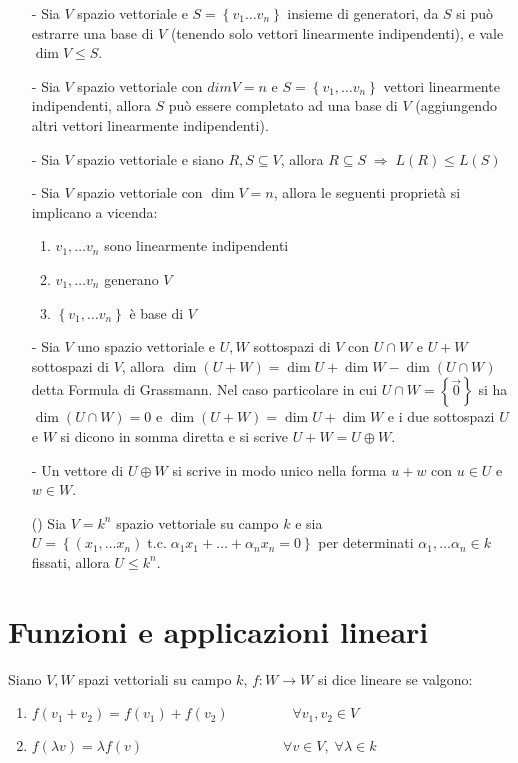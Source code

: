 \documentclass[a4paper]{article}
\newcommand\tc{\;\text{t.c.}\;} %
\begin{document}
\begin{itemize}
	\item[-] Sia \(V\) spazio vettoriale e \(S = \left\{ v_1 \dots v_n \right\}\) insieme di generatori, da \(S\) si può estrarre
	una base di \(V\) (tenendo solo vettori linearmente indipendenti), e vale \(\dim V \leq S\).
	
	\item[-] Sia \(V\) spazio vettoriale con \(dim V = n\) e \(S = \left\{ v_1, \dots v_n \right\}\) vettori linearmente indipendenti,
	allora \(S\) può essere completato ad una base di \(V\) (aggiungendo altri vettori linearmente indipendenti).
	
	\item[-] Sia \(V\) spazio vettoriale e siano \(R,S \subseteq V\), allora \(R \subseteq S \; \Rightarrow \; L(R) \leq L(S)\)
	
	\item[-] Sia \(V\) spazio vettoriale con \(\dim V = n\), allora le seguenti proprietà si implicano a vicenda:
	\begin{enumerate}
		\item \(v_1, \dots v_n\) sono linearmente indipendenti
		\item \(v_1, \dots v_n\) generano \(V\)
		\item \(\left\{ v_1, \dots v_n \right\}\) è base di \(V\)
	\end{enumerate}
	
	\item[-] Sia \(V\) uno spazio vettoriale e \(U, W\) sottospazi di \(V\) con \(U \cap W\) e \(U + W\) sottospazi di \(V\), allora
	\(\dim (U + W) = \dim U + \dim W - \dim (U \cap W)\) detta Formula di Grassmann. Nel caso particolare in cui \(U \cap W = \left\{ \vec{0} \right\}\)
	si ha \(\dim (U \cap W) = 0\) e \(\dim (U + W) = \dim U + \dim W\) e i due sottospazi \(U\) e \(W\) si dicono in somma diretta
	e si scrive \(U + W = U \oplus W\).

	\item[-] Un vettore di \(U \oplus W\) si scrive in modo unico nella forma \(u + w\) con \(u \in U\) e \(w \in W\).
	
	\item[()] Sia \(V = k^n\) spazio vettoriale su campo \(k\) e sia \(U = \left\{ (x_1, \dots x_n) \tc \alpha_1 x_1 + \dots + \alpha_n x_n = 0\right\}\)
	per determinati \(\alpha_1, \dots \alpha_n \in k\) fissati, allora \(U \leq k^n\).
\end{itemize}

\newpage

\section{Funzioni e applicazioni lineari}
Siano \(V, W\) spazi vettoriali su campo \(k\), \(f: W \to W\) si dice lineare se valgono:
\begin{enumerate}
	\item \(f(v_1 + v_2) = f(v_1) + f(v_2) \qquad \qquad \;\; \forall v_1, v_2 \in V\)
	\item \(f(\lambda v) = \lambda f(v) \qquad \qquad \qquad \qquad \qquad \forall v \in V, \; \forall \lambda \in k\)
\end{enumerate}
\end{document}
